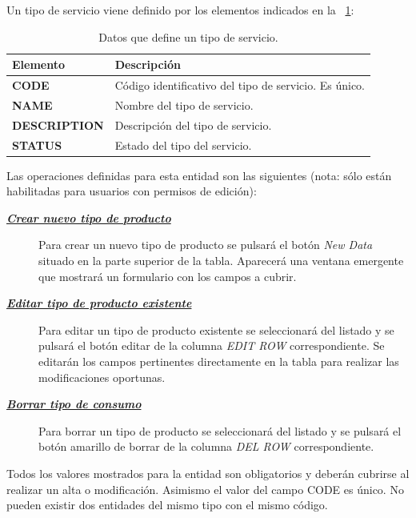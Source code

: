Un tipo de servicio viene definido por los elementos indicados en la \tablename~\ref{tab:tipo-servicio}:



\begin{table}[H]
  \centering
  \setlength{\leftmargini}{0.4cm}
  \resizebox{14cm}{!} {
  \begin{tabular}{|m{3cm} m{11cm}|}
  \rowcolor{udcpink!25}
  \hline
  	\textbf{Elemento} & \textbf{Descripción} \\\hline
	\textbf{CODE} & Código identificativo del tipo de servicio. Es único.   \\
	\textbf{NAME} & Nombre del tipo de servicio. \\
	\textbf{DESCRIPTION} & Descripción del tipo de servicio. \\		
	\textbf{STATUS} & Estado del tipo del servicio.
	\\\hline
  \end{tabular}
  } %
  \caption{Datos que define un tipo de servicio.}
  \label{tab:tipo-servicio}
\end{table}

Las operaciones definidas para esta entidad son las siguientes (nota: sólo están habilitadas para usuarios con permisos de edición):
\begin{description}
\item[\underline{\textsl{\textbf{Crear nuevo tipo de producto}}}] Para crear un nuevo tipo de producto se pulsará el botón \textit{New Data} situado en la parte superior de la tabla. Aparecerá una ventana emergente que mostrará un formulario con los campos a cubrir.

\item[\underline{\textsl{\textbf{Editar tipo de producto existente}}}] Para editar un tipo de producto existente se seleccionará del listado y se pulsará el botón editar de la columna \textit{EDIT ROW} correspondiente. Se editarán los campos pertinentes directamente en la tabla para realizar las modificaciones oportunas. 

\item[\underline{\textsl{\textbf{Borrar tipo de consumo}}}] Para borrar un tipo de producto se seleccionará del listado y se pulsará el botón amarillo de borrar de la columna \textit{DEL ROW} correspondiente.
\end{description}

Todos los valores mostrados para la entidad son obligatorios y deberán cubrirse al realizar un alta o modificación. Asimismo el valor del campo CODE es único. No pueden existir dos entidades del mismo tipo con el mismo código.




